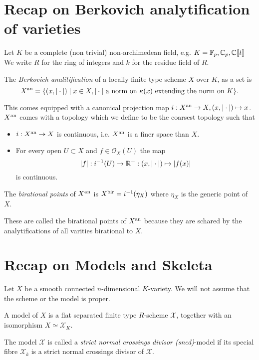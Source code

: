 \section{Recap on Berkovich analytification of varieties} \label{sec:recap_on_berkovich_analytification}

Let $K$ be a complete (non trivial) non-archimedean field, e.g. $K= \mathbb{F}_p, \mathbb{C}_p, \mathbb{C}\llbracket t \rrbracket$
We write $R$ for the ring of integers and $k$ for the residue field of $R$. 

\begin{definition}\label{def:berkovich_analytification_explicit}
	The \emph{Berkovich analitification} of a locally finite type scheme $X$ over  $K$, as a set is \[
		X{}^{\text{an}} = \{(x, |\cdot |)  \mid x\in X, |\cdot | \text{ a norm on } \kappa(x) \text{ extending the norm on }K \} 
	.\] 

	This comes equipped with a canonical projection map $i: X{}^{\text{an}} \to X, (x, |\cdot |) \mapsto  x$.
	$X{}^{\text{an}} $ comes with a topology which we define to be the coarsest topology such that 
	\begin{itemize}
		\item $i: X{}^{\text{an}} \to X$ is continuous, i.e. $X{}^{\text{an}}$ is a finer space than  $X$. 
		\item For every open $U \subset X$ and $f \in \mathcal{O}_X(U)$ the map  \[
				|f|: i^{-1}(U) \to \mathbb{R}^{+}: (x, |\cdot |) \mapsto  |f(x)|
		\] 
		is continuous.
	\end{itemize}
\end{definition}

\begin{definition}
	The \emph{birational points} of $X{}^{\text{an}}$ is  $X{}^{\text{bir}} = i ^{-1}(\eta_X)$ where $\eta_X$ is the generic point of $X$. 
\end{definition}
These are called the birational points of $X{}^{\text{an}}$ because they are schared by the analytifications of all varities birational to $X$.

\section{Recap on Models and Skeleta} \label{sec:recap_on_models_and_skeleta}
Let $X$ be a smooth connected $n$-dimensional $K$-variety. 
We will not assume that the scheme or the model is proper. 
\begin{definition}
	A model of $X$ is a flat separated finite type $R$-scheme $\mathscr X$, together with an isomorphism $X \simeq \mathscr X_K$.

	The model $\mathscr X$ is called a \emph{strict normal crossings divisor (sncd)}-model if its special fibre $\mathscr X_k$ is a strict normal crossings divisor of $\mathscr X$. 
\end{definition}

